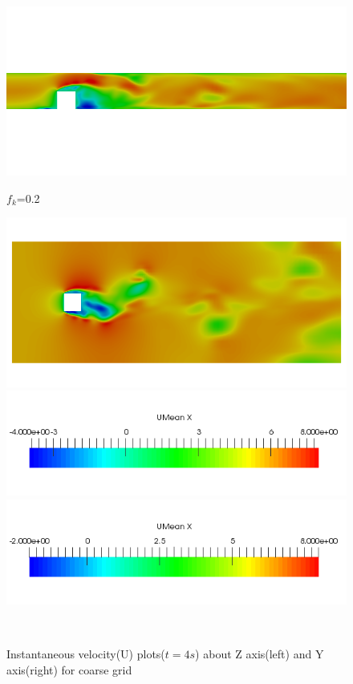 \begin{figure}[H]
\begin{minipage}[b]{0.5\linewidth}
\includegraphics[scale=0.25]{figure/coarse/two/Umag_z.png}
\caption*{$f_k$=0.2}
\end{minipage}
\begin{minipage}[b]{0.5\linewidth}
\includegraphics[scale=0.25]{figure/coarse/two/Umag_y.png}
\caption*{}
\end{minipage}
\begin{minipage}[b]{0.5\linewidth}
\includegraphics[scale=0.35]{figure/z_scale.png}
\end{minipage}
\begin{minipage}[b]{0.5\linewidth}
\includegraphics[scale=0.35]{figure/y_scale.png}
\end{minipage}\\
\caption{Instantaneous velocity(U) plots($t=4s$) about Z axis(left) and Y axis(right) for coarse grid}
\label{fig:43}
\end{figure}


